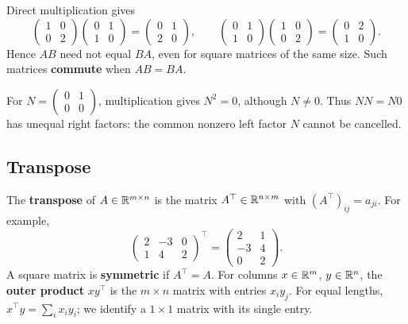 \begin{example}\label{example:01:noncommute}
Direct multiplication gives
\[
\begin{pmatrix}1&0\\0&2\end{pmatrix}
\begin{pmatrix}0&1\\1&0\end{pmatrix}
=\begin{pmatrix}0&1\\2&0\end{pmatrix},\qquad
\begin{pmatrix}0&1\\1&0\end{pmatrix}
\begin{pmatrix}1&0\\0&2\end{pmatrix}
=\begin{pmatrix}0&2\\1&0\end{pmatrix}.
\]
Hence \(AB\) need not equal \(BA\), even for square matrices of the same
size. Such matrices \textbf{commute} when \(AB=BA\).

For \(N=\begin{pmatrix}0&1\\0&0\end{pmatrix}\), multiplication gives
\(N^2=0\), although \(N\ne0\). Thus \(NN=N0\) has unequal right factors:
the common nonzero left factor \(N\) cannot be cancelled.
\end{example}

\subsection*{Transpose}
The \textbf{transpose} of \(A\in\mathbb R^{m\times n}\) is the matrix
\(A^\top\in\mathbb R^{n\times m}\) with \((A^\top)_{ij}=a_{ji}\).
For example,
\[
\begin{pmatrix}2&-3&0\\1&4&2\end{pmatrix}^{\!\top}
=\begin{pmatrix}2&1\\-3&4\\0&2\end{pmatrix}.
\]
A square matrix is \textbf{symmetric} if \(A^\top=A\).
For columns \(x\in\mathbb R^m\), \(y\in\mathbb R^n\), the \textbf{outer product}
\(xy^\top\) is the \(m\times n\) matrix with entries \(x_i y_j\).
For equal lengths, \(x^\top y=\sum_i x_i y_i\); we identify a
\(1\times1\) matrix with its single entry.

